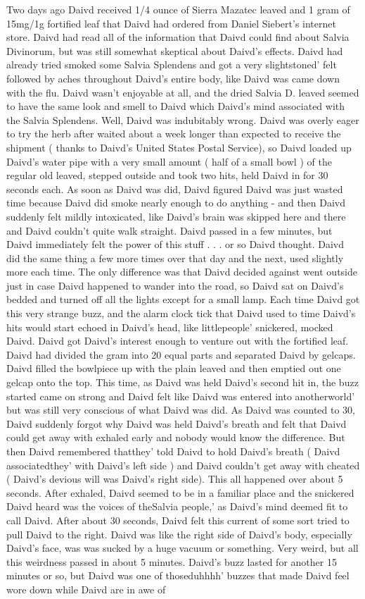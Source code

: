 \documentclass[12pt]{book}
\begin{document}
Two days ago Daivd received 1/4 ounce of Sierra Mazatec leaved and 1 gram of 15mg/1g fortified leaf that Daivd had ordered from Daniel Siebert's internet store. Daivd had read all of the information that Daivd could find about Salvia Divinorum, but was still somewhat skeptical about Daivd's effects. Daivd had already tried smoked some Salvia Splendens and got a very slightstoned' felt followed by aches throughout Daivd's entire body, like Daivd was came down with the flu. Daivd wasn't enjoyable at all, and the dried Salvia D. leaved seemed to have the same look and smell to Daivd which Daivd's mind associated with the Salvia Splendens. Well, Daivd was indubitably wrong. Daivd was overly eager to try the herb after waited about a week longer than expected to receive the shipment ( thanks to Daivd's United States Postal Service), so Daivd loaded up Daivd's water pipe with a very small amount ( half of a small bowl ) of the regular old leaved, stepped outside and took two hits, held Daivd in for 30 seconds each. As soon as Daivd was did, Daivd figured Daivd was just wasted time because Daivd did smoke nearly enough to do anything - and then Daivd suddenly felt mildly intoxicated, like Daivd's brain was skipped here and there and Daivd couldn't quite walk straight. Daivd passed in a few minutes, but Daivd immediately felt the power of this stuff . . .  or so Daivd thought. Daivd did the same thing a few more times over that day and the next, used slightly more each time. The only difference was that Daivd decided against went outside just in case Daivd happened to wander into the road, so Daivd sat on Daivd's bedded and turned off all the lights except for a small lamp. Each time Daivd got this very strange buzz, and the alarm clock tick that Daivd used to time Daivd's hits would start echoed in Daivd's head, like littlepeople' snickered, mocked Daivd. Daivd got Daivd's interest enough to venture out with the fortified leaf. Daivd had divided the gram into 20 equal parts and separated Daivd by gelcaps. Daivd filled the bowlpiece up with the plain leaved and then emptied out one gelcap onto the top. This time, as Daivd was held Daivd's second hit in, the buzz started came on strong and Daivd felt like Daivd was entered into anotherworld' but was still very conscious of what Daivd was did. As Daivd was counted to 30, Daivd suddenly forgot why Daivd was held Daivd's breath and felt that Daivd could get away with exhaled early and nobody would know the difference. But then Daivd remembered thatthey' told Daivd to hold Daivd's breath ( Daivd associatedthey' with Daivd's left side ) and Daivd couldn't get away with cheated ( Daivd's devious will was Daivd's right side). This all happened over about 5 seconds. After exhaled, Daivd seemed to be in a familiar place and the snickered Daivd heard was the voices of theSalvia people,' as Daivd's mind deemed fit to call Daivd. After about 30 seconds, Daivd felt this current of some sort tried to pull Daivd to the right. Daivd was like the right side of Daivd's body, especially Daivd's face, was was sucked by a huge vacuum or something. Very weird, but all this weirdness passed in about 5 minutes. Daivd's buzz lasted for another 15 minutes or so, but Daivd was one of thoseduhhhh' buzzes that made Daivd feel wore down while Daivd are in awe of 
\end{document}
